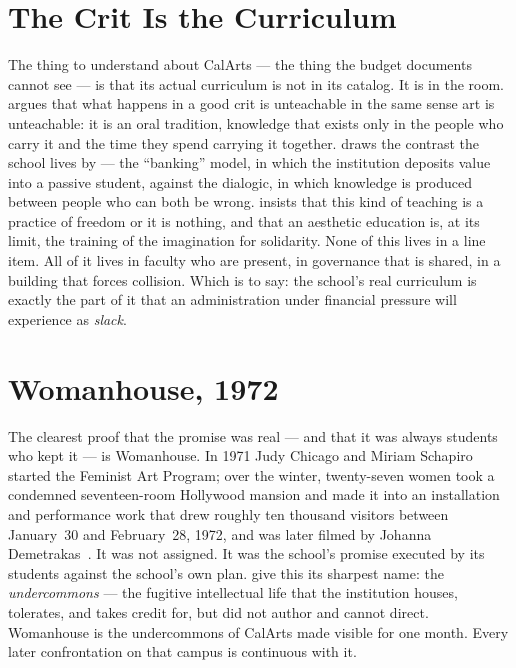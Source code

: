 \documentclass[10pt,letterpaper,twocolumn]{article}
\begin{document}
\section{The Crit Is the Curriculum}

The thing to understand about CalArts --- the thing the budget documents
cannot see --- is that its actual curriculum is not in its catalog. It is in
the room. \citet{elkins2001why} argues that what happens in a good crit is
unteachable in the same sense art is unteachable: it is an oral tradition,
knowledge that exists only in the people who carry it and the time they spend
carrying it together. \citet{freire1970pedagogy} draws the contrast the
school lives by --- the ``banking'' model, in which the institution deposits
value into a passive student, against the dialogic, in which knowledge is
produced between people who can both be wrong. \citet{hooks1994teaching}
insists that this kind of teaching is a practice of freedom or it is nothing,
and \citet{spivak2012aesthetic} that an aesthetic education is, at its limit,
the training of the imagination for solidarity. None of this lives in a line
item. All of it lives in faculty who are present, in governance that is
shared, in a building that forces collision. Which is to say: the school's
real curriculum is exactly the part of it that an administration under
financial pressure will experience as \emph{slack}.

\section{Womanhouse, 1972}

The clearest proof that the promise was real --- and that it was always
students who kept it --- is Womanhouse. In 1971 Judy Chicago and Miriam
Schapiro started the Feminist Art Program; over the winter, twenty-seven
women took a condemned seventeen-room Hollywood mansion and made it into an
installation and performance work that drew roughly ten thousand visitors
between January~30 and February~28, 1972, and was later filmed by Johanna
Demetrakas~\citep{womanhouse2024wiki, calarts_femlib}. It was not assigned. It
was the school's promise executed by its students against the school's own
plan. \citet{harney2013undercommons} give this its sharpest name: the
\emph{undercommons} --- the fugitive intellectual life that the institution
houses, tolerates, and takes credit for, but did not author and cannot
direct. Womanhouse is the undercommons of CalArts made visible for one month.
Every later confrontation on that campus is continuous with it.
\end{document}
